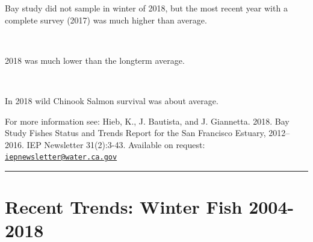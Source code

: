 \documentclass[
]{book}
\begin{document}
\begin{panel-grid}
\begin{columns-nocenter}
\end{columns-nocenter}

\begin{columns-nocenter}

\begin{column800}

Bay study did not sample in winter of 2018, but the most recent year with a complete survey (2017) was much higher than average.

\end{column800}

\begin{column40}

~

\end{column40}

\begin{column800}

2018 was much lower than the longterm average.

\end{column800}

\begin{column40}

~

\end{column40}

\begin{column800}

In 2018 wild Chinook Salmon survival was about average.

\end{column800}

\end{columns-nocenter}

\end{panel-grid}

\begin{disclaimer}
For more information see: Hieb, K., J. Bautista, and J. Giannetta. 2018.
Bay Study Fishes Status and Trends Report for the San Francisco Estuary,
2012--2016. IEP Newsletter 31(2):3-43. Available on request:
\href{mailto:iepnewsletter@water.ca.gov}{\nolinkurl{iepnewsletter@water.ca.gov}}
\end{disclaimer}

\begin{center}\rule{0.5\linewidth}{0.5pt}\end{center}

\hypertarget{recent-trends-winter-fish-2004-2018}{%
\section{Recent Trends: Winter Fish 2004-2018}\label{recent-trends-winter-fish-2004-2018}}
\end{document}
